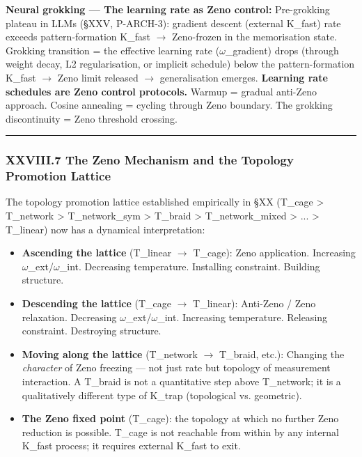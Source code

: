 \documentclass[12pt,a4paper]{article}
\begin{document}
\textbf{Neural grokking --- The learning rate as Zeno control:}
Pre-grokking plateau in LLMs (§XXV, P-ARCH-3): gradient descent (external K\_fast) rate exceeds pattern-formation K\_fast $\rightarrow$ Zeno-frozen in the memorisation state. Grokking transition = the effective learning rate ($\omega$\_gradient) drops (through weight decay, L2 regularisation, or implicit schedule) below the pattern-formation K\_fast $\rightarrow$ Zeno limit released $\rightarrow$ generalisation emerges. \textbf{Learning rate schedules are Zeno control protocols.} Warmup = gradual anti-Zeno approach. Cosine annealing = cycling through Zeno boundary. The grokking discontinuity = Zeno threshold crossing.

\begin{center}
\rule{0.5\textwidth}{0.4pt}
\end{center}

\subsubsection{XXVIII.7 The Zeno Mechanism and the Topology Promotion Lattice}

The topology promotion lattice established empirically in §XX (T\_cage \textgreater{} T\_network \textgreater{} T\_network\_sym \textgreater{} T\_braid \textgreater{} T\_network\_mixed \textgreater{} ... \textgreater{} T\_linear) now has a dynamical interpretation:

\begin{itemize}
    \item \textbf{Ascending the lattice} (T\_linear $\rightarrow$ T\_cage): Zeno application. Increasing $\omega$\_ext/$\omega$\_int. Decreasing temperature. Installing constraint. Building structure.
    \item \textbf{Descending the lattice} (T\_cage $\rightarrow$ T\_linear): Anti-Zeno / Zeno relaxation. Decreasing $\omega$\_ext/$\omega$\_int. Increasing temperature. Releasing constraint. Destroying structure.
    \item \textbf{Moving along the lattice} (T\_network $\rightarrow$ T\_braid, etc.): Changing the \emph{character} of Zeno freezing --- not just rate but topology of measurement interaction. A T\_braid is not a quantitative step above T\_network; it is a qualitatively different type of K\_trap (topological vs. geometric).
    \item \textbf{The Zeno fixed point} (T\_cage): the topology at which no further Zeno reduction is possible. T\_cage is not reachable from within by any internal K\_fast process; it requires external K\_fast to exit.
\end{itemize}
\end{document}
